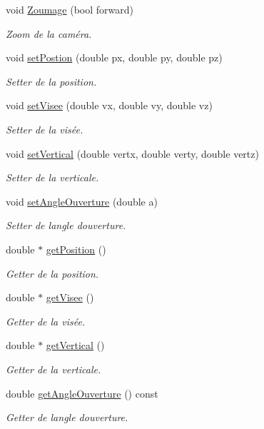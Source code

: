 \begin{DoxyCompactItemize}
void \hyperlink{class_abstract_camera_a658752e59c42aacadb3e05b811c5b733}{Zoumage} (bool forward)
\begin{DoxyCompactList}\small\item\em Zoom de la caméra. \end{DoxyCompactList}\item 
void \hyperlink{class_abstract_camera_a4bb45e9a3775b226b55a4bda90225fea}{set\+Postion} (double px, double py, double pz)
\begin{DoxyCompactList}\small\item\em Setter de la position. \end{DoxyCompactList}\item 
void \hyperlink{class_abstract_camera_ab6c48b6b2dcca743e826c9ca4c22940a}{set\+Visee} (double vx, double vy, double vz)
\begin{DoxyCompactList}\small\item\em Setter de la visée. \end{DoxyCompactList}\item 
void \hyperlink{class_abstract_camera_a0a17e0970ff82be9528a72ee427468ac}{set\+Vertical} (double vertx, double verty, double vertz)
\begin{DoxyCompactList}\small\item\em Setter de la verticale. \end{DoxyCompactList}\item 
void \hyperlink{class_abstract_camera_ae9bdb1abdae4301b45d43225911c210a}{set\+Angle\+Ouverture} (double a)
\begin{DoxyCompactList}\small\item\em Setter de l\textquotesingle{}angle d\textquotesingle{}ouverture. \end{DoxyCompactList}\item 
double $\ast$ \hyperlink{class_abstract_camera_a5cca3eaaa1f344ff1f32e63a37fc1d71}{get\+Position} ()
\begin{DoxyCompactList}\small\item\em Getter de la position. \end{DoxyCompactList}\item 
double $\ast$ \hyperlink{class_abstract_camera_abfcc9c4b7966c4f82cbeec8ab6c26cfb}{get\+Visee} ()
\begin{DoxyCompactList}\small\item\em Getter de la visée. \end{DoxyCompactList}\item 
double $\ast$ \hyperlink{class_abstract_camera_aff23298b11dca5e8cdcd671ef2f1bed4}{get\+Vertical} ()
\begin{DoxyCompactList}\small\item\em Getter de la verticale. \end{DoxyCompactList}\item 
double \hyperlink{class_abstract_camera_abcc835cc1c56fdd987b03c51b0e3fa73}{get\+Angle\+Ouverture} () const 
\begin{DoxyCompactList}\small\item\em Getter de l\textquotesingle{}angle d\textquotesingle{}ouverture. \end{DoxyCompactList}\end{DoxyCompactItemize}

